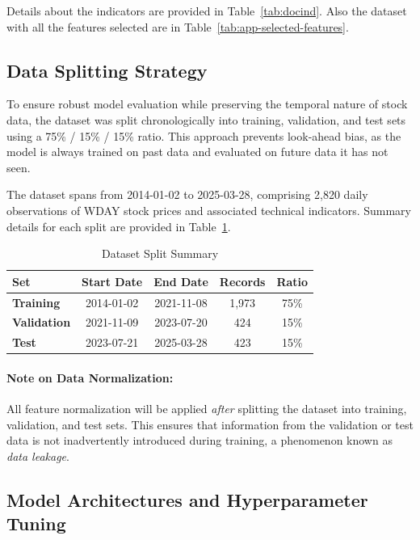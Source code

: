 Details about the indicators are provided in Table~\ref{tab:docind}. Also the dataset with all the features
selected are in Table~\ref{tab:app-selected-features}.

\subsection{Data Splitting Strategy}

To ensure robust model evaluation while preserving the temporal nature of stock data, the
dataset was split chronologically into training, validation, and test sets using a 
75\% / 15\% / 15\% ratio. This approach prevents look-ahead bias, as the model is always
trained on past data and evaluated on future data it has not seen.

The dataset spans from 2014-01-02 to 2025-03-28, comprising 2,820 daily observations of
WDAY stock prices and associated technical indicators. Summary details for each split are provided in Table~\ref{tab:data-split-summary}.

\begin{table}[H]
\centering
\caption{Dataset Split Summary}
\label{tab:data-split-summary}
\begin{tabular}{lcccc}
\hline
\textbf{Set} & \textbf{Start Date} & \textbf{End Date} & \textbf{Records} & \textbf{Ratio} \\
\hline\hline
\textbf{Training}     & 2014-01-02 & 2021-11-08 & 1,973 & 75\% \\
\textbf{Validation}   & 2021-11-09 & 2023-07-20 & 424   & 15\% \\
\textbf{Test}         & 2023-07-21 & 2025-03-28 & 423   & 15\% \\
\hline
\end{tabular}
\end{table}

\paragraph{Note on Data Normalization:}  
All feature normalization will be applied \emph{after} splitting the dataset
into training, validation, and test sets. This ensures that information 
from the validation or test data is not inadvertently introduced during
training, a phenomenon known as \emph{data leakage}. 

\subsection{Model Architectures and Hyperparameter Tuning}

